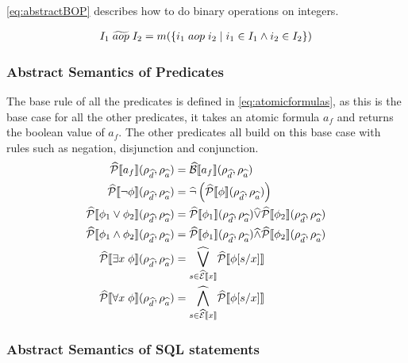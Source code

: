 \autoref{eq:abstractBOP} describes how to do binary operations on integers.

\begin{align}
    I_1 \;\aab{aop}\; I_2 &= m(\{i_1 \; aop \; i_2 \mid i_1 \in I_1 \land i_2 \in I_2\}) \\  \label{eq:abstractBOP}
\end{align}

\subsubsection{Abstract Semantics of Predicates}
The base rule of all the predicates is defined in \autoref{eq:atomicformulas}, as this is the base case for all the other predicates, it takes an atomic formula $a_f$ and returns the boolean value of $a_f$.
The other predicates all build on this base case with rules such as negation, disjunction and conjunction.
\begin{align}
    \abspredsem{a_f}(\rho_{\ab{d}}, \rho_{\ab{a}}) &= \absboolsem{a_f}(\rho_{\ab{d}}, \rho_{\ab{a}}) \\ \label{eq:atomicformulas}
    \abspredsem{\neg \phi}(\rho_{\ab{d}}, \rho_{\ab{a}}) &= \ab{\neg} \left( \abspredsem{\phi}(\rho_{\ab{d}}, \rho_{\ab{a}}) \right) \\
    \abspredsem{\phi_1 \lor \phi_2}(\rho_{\ab{d}}, \rho_{\ab{a}}) &= \abspredsem{\phi_1}(\rho_{\ab{d}}, \rho_{\ab{a}}) \ab{\lor} \abspredsem{\phi_2}(\rho_{\ab{d}}, \rho_{\ab{a}}) \\
    \abspredsem{\phi_1 \land \phi_2}(\rho_{\ab{d}}, \rho_{\ab{a}}) &= \abspredsem{\phi_1}(\rho_{\ab{d}}, \rho_{\ab{a}}) \ab{\land} \abspredsem{\phi_2}(\rho_{\ab{d}}, \rho_{\ab{a}}) \\
    \abspredsem{\exists x \; \phi}(\rho_{\ab{d}}, \rho_{\ab{a}}) &= \underset{s \in \absexpsem{x}}{\ab{\bigvee}} \abspredsem{\phi[s/x]} \\
    \abspredsem{\forall x \; \phi}(\rho_{\ab{d}}, \rho_{\ab{a}}) &= \underset{s \in \absexpsem{x}}{\ab{\bigwedge}} \abspredsem{\phi[s/x]}
\end{align}

\subsubsection{Abstract Semantics of SQL statements}

